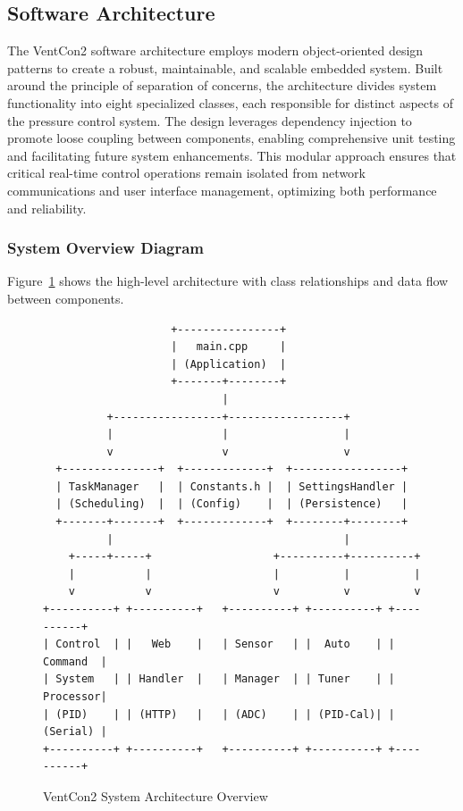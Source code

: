 \documentclass[12pt,a4paper]{article}
\begin{document}
\subsection{Software Architecture}
The VentCon2 software architecture employs modern object-oriented design patterns to create a robust, maintainable, and scalable embedded system. Built around the principle of separation of concerns, the architecture divides system functionality into eight specialized classes, each responsible for distinct aspects of the pressure control system. The design leverages dependency injection to promote loose coupling between components, enabling comprehensive unit testing and facilitating future system enhancements. This modular approach ensures that critical real-time control operations remain isolated from network communications and user interface management, optimizing both performance and reliability.


\subsubsection{System Overview Diagram}
Figure~\ref{fig:system-overview} shows the high-level architecture with class relationships and data flow between components.

\begin{figure}[H]
\centering
\begin{verbatim}
                    +----------------+
                    |   main.cpp     |
                    | (Application)  |
                    +-------+--------+
                            |
          +-----------------+------------------+
          |                 |                  |
          v                 v                  v
  +---------------+  +-------------+  +-----------------+
  | TaskManager   |  | Constants.h |  | SettingsHandler |
  | (Scheduling)  |  | (Config)    |  | (Persistence)   |
  +-------+-------+  +-------------+  +--------+--------+
          |                                    |
    +-----+-----+                   +----------+----------+
    |           |                   |          |          |
    v           v                   v          v          v
+----------+ +----------+   +----------+ +----------+ +----------+
| Control  | |   Web    |   | Sensor   | |  Auto    | | Command  |
| System   | | Handler  |   | Manager  | | Tuner    | | Processor|
| (PID)    | | (HTTP)   |   | (ADC)    | | (PID-Cal)| | (Serial) |
+----------+ +----------+   +----------+ +----------+ +----------+
\end{verbatim}
\caption{VentCon2 System Architecture Overview}
\label{fig:system-overview}
\end{figure}
\end{document}
